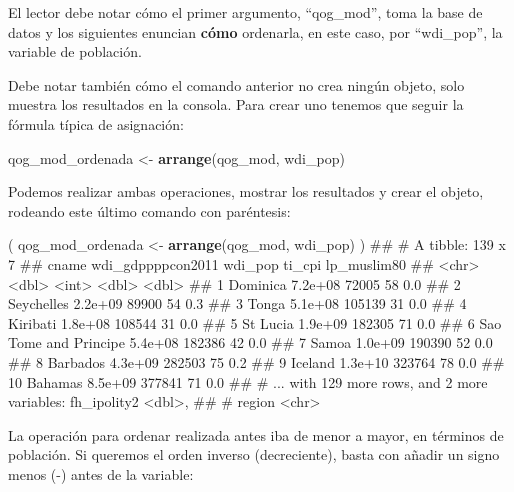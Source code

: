 \documentclass[]{book}
\newenvironment{Shaded}{\begin{snugshade}}{\end{snugshade}}
\newcommand{\KeywordTok}[1]{\textcolor[rgb]{0.13,0.29,0.53}{\textbf{#1}}}
\newcommand{\StringTok}[1]{\textcolor[rgb]{0.31,0.60,0.02}{#1}}
\newcommand{\NormalTok}[1]{#1}
\begin{document}
El lector debe notar cómo el primer argumento, ``qog\_mod'', toma la
base de datos y los siguientes enuncian \textbf{cómo} ordenarla, en este
caso, por ``wdi\_pop'', la variable de población.

Debe notar también cómo el comando anterior no crea ningún objeto, solo
muestra los resultados en la consola. Para crear uno tenemos que seguir
la fórmula típica de asignación:

\begin{Shaded}
\begin{Highlighting}[]
\NormalTok{qog_mod_ordenada <-}\StringTok{ }\KeywordTok{arrange}\NormalTok{(qog_mod, wdi_pop)}
\end{Highlighting}
\end{Shaded}

Podemos realizar ambas operaciones, mostrar los resultados y crear el
objeto, rodeando este último comando con paréntesis:

\begin{Shaded}
\begin{Highlighting}[]
\NormalTok{( qog_mod_ordenada <-}\StringTok{ }\KeywordTok{arrange}\NormalTok{(qog_mod, wdi_pop) )}
\NormalTok{## # A tibble: 139 x 7}
\NormalTok{##                    cname wdi_gdppppcon2011 wdi_pop ti_cpi lp_muslim80}
\NormalTok{##                    <chr>             <dbl>   <int>  <dbl>       <dbl>}
\NormalTok{##  1              Dominica           7.2e+08   72005     58         0.0}
\NormalTok{##  2            Seychelles           2.2e+09   89900     54         0.3}
\NormalTok{##  3                 Tonga           5.1e+08  105139     31         0.0}
\NormalTok{##  4              Kiribati           1.8e+08  108544     31         0.0}
\NormalTok{##  5              St Lucia           1.9e+09  182305     71         0.0}
\NormalTok{##  6 Sao Tome and Principe           5.4e+08  182386     42         0.0}
\NormalTok{##  7                 Samoa           1.0e+09  190390     52         0.0}
\NormalTok{##  8              Barbados           4.3e+09  282503     75         0.2}
\NormalTok{##  9               Iceland           1.3e+10  323764     78         0.0}
\NormalTok{## 10               Bahamas           8.5e+09  377841     71         0.0}
\NormalTok{## # ... with 129 more rows, and 2 more variables: fh_ipolity2 <dbl>,}
\NormalTok{## #   region <chr>}
\end{Highlighting}
\end{Shaded}

La operación para ordenar realizada antes iba de menor a mayor, en
términos de población. Si queremos el orden inverso (decreciente), basta
con añadir un signo menos (-) antes de la variable:
\end{document}
